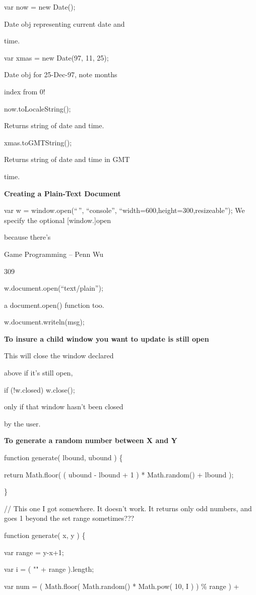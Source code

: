 \documentclass[
]{article}
\begin{document}
var now = new Date();

Date obj representing current date and

time.

var xmas = new Date(97, 11, 25);

Date obj for 25-Dec-97, note months

index from 0!

now.toLocaleString();

Returns string of date and time.

xmas.toGMTString();

Returns string of date and time in GMT

time.

\textbf{Creating a Plain-Text Document}

var w = window.open(``\,'', ``console'',
``width=600,height=300,resizeable''); We specify the optional
{[}window.{]}open

because there's

Game Programming -- Penn Wu

309

\protect\hypertarget{index_split_015.htmlux5cux23p310}{}{}w.document.open(``text/plain'');

a document.open() function too.

w.document.writeln(msg);

\textbf{To insure a child window you want to update is still open}

This will close the window declared

above if it's still open,

if (!w.closed) w.close();

only if that window hasn't been closed

by the user.

\textbf{To generate a random number between X and Y}

function generate( lbound, ubound ) \{

return Math.floor( ( ubound - lbound + 1 ) * Math.random() + lbound );

\}

// This one I got somewhere. It doesn't work. It returns only odd
numbers, and goes 1 beyond the set range sometimes???

function generate( x, y ) \{

var range = y-x+1;

var i = ( "" + range ).length;

var num = ( Math.floor( Math.random() * Math.pow( 10, I ) ) \% range ) +
\end{document}
